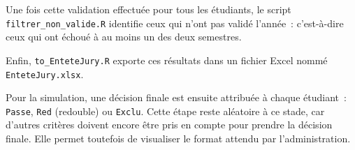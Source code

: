 \vspace{0.5em}
Une fois cette validation effectuée pour tous les étudiants, le script \texttt{filtrer\_non\_valide.R} identifie ceux qui n'ont pas validé l’année~: c’est-à-dire ceux qui ont échoué à au moins un des deux semestres.

\vspace{0.5em}
Enfin, \texttt{to\_EnteteJury.R} exporte ces résultats dans un fichier Excel nommé \texttt{EnteteJury.xlsx}.

\vspace{0.5em}
Pour la simulation, une décision finale est ensuite attribuée à chaque étudiant~: \texttt{Passe}, \texttt{Red} (redouble) ou \texttt{Exclu}. Cette étape reste aléatoire à ce stade, car d'autres critères doivent encore être pris en compte pour prendre la décision finale. Elle permet toutefois de visualiser le format attendu par l’administration.
